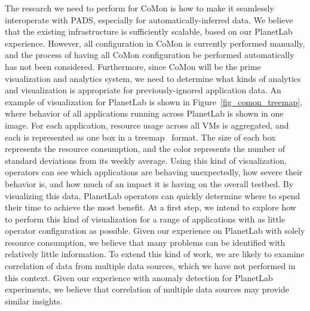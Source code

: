 The research we need to perform for CoMon is how to make it seamlessly
interoperate with PADS, especially for automatically-inferred data. We
believe that the existing infrastructure is sufficiently scalable,
based on our PlanetLab experience. However, all configuration in CoMon
is currently performed manually, and the process of having all CoMon
configuration be performed automatically has not been
considered. Furthermore, since CoMon will be the prime visualization
and analytics system, we need to determine what kinds of analytics and
visualization is appropriate for previously-ignored application data.
An example of visualization for PlanetLab is shown in
Figure~\ref{fig_comon_treemap}, where behavior of all applications
running across PlanetLab is shown in one image. For each application,
resource usage across all VMs is aggregated, and each is represented
as one box in a treemap~\cite{treemap} format. The size of each box
represents the resource consumption, and the color represents the
number of standard deviations from its weekly average. Using this kind
of visualization, operators can see which applications are behaving
unexpectedly, how severe their behavior is, and how much of an impact
it is having on the overall testbed. By visualizing this data,
PlanetLab operators can quickly determine where to spend their time to
achieve the most benefit.  At a first step, we intend to explore how
to perform this kind of visualization for a range of applications with
as little operator configuration as possible.  Given our experience on
PlanetLab with solely resource consumption, we believe that many
problems can be identified with relatively little information. To
extend this kind of work, we are likely to examine correlation of data
from multiple data sources, which we have not performed in this
context.  Given our experience with anomaly detection for PlanetLab
experiments, we believe that correlation of multiple data sources may
provide similar insights.
